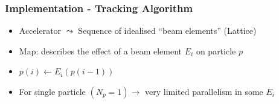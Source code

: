 \documentclass{beamer}
\begin{document}
\begin{frame}[t]
\frametitle{Implementation - Tracking Algorithm}
\begin{itemize}
 \item<1-> Accelerator $\leadsto$ Sequence of idealised {\color{MyDarkBlue}``beam elements''} ({\color{MyDarkBlue}Lattice})
 \item<2-> {\color{MyDarkBlue}Map:} describes the effect of a beam element $E_i$ on particle $p$
 \item<3-> $p\left( i \right) \gets E_i\left( p\left( i - 1 \right) \right)${}
 \item<5-> For single particle $(N_p = 1) \rightarrow$ very limited parallelism in some $E_i$
\end{itemize}


\end{frame}
\end{document}
